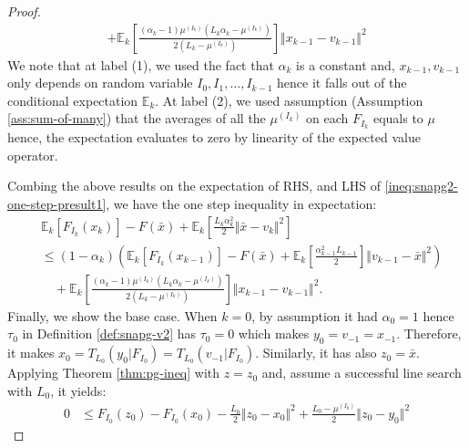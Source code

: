 \documentclass[12pt]{article}
\begin{document}
\begin{proof}
{\begin{align*}
                    + \mathbb E_k\left[
                        \frac{(\alpha_k - 1)\mu^{(I_k)}\left(L_k\alpha_k - \mu^{(I_k)}\right)}{2\left(L_k - \mu^{(I_k)}\right)}
                    \right]\Vert x_{k - 1} - v_{k - 1} \Vert^2
            \end{align*}
            }
            We note that at label (1), we used the fact that $\alpha_k$ is a constant and, $x_{k - 1}, v_{k - 1}$ only depends on random variable $I_0, I_1, \ldots, I_{k - 1}$ hence it falls out of the conditional expectation $\mathbb E_k$. 
            At label (2), we used assumption (Assumption \ref{ass:sum-of-many}) that the averages of all the $\mu^{(I_k)}$ on each $F_{I_k}$ equals to $\mu$ hence, the expectation evaluates to zero by linearity of the expected value operator. 
            \par
            Combing the above results on the expectation of RHS, and LHS of \eqref{ineq:snapg2-one-step-presult1}, we have the one step inequality in expectation: 
            \begin{align*}
                & \mathbb E_k\left[F_{I_k}(x_{k})\right] 
                - F(\bar x) 
                + \mathbb E_k\left[
                    \frac{L_k\alpha_k^2}{2}\Vert \bar x - v_k\Vert^2 
                \right]
                \\
                &\le 
                (1 - \alpha_k)\left(
                        \mathbb E_k \left[F_{I_k}(x_{k - 1})\right] 
                        - F(\bar x)
                        + \mathbb E_k \left[\frac{\alpha_{k - 1}^2L_{k - 1}}{2}\right]\Vert v_{k - 1} - \bar x\Vert^2
                \right)
                    \\ &\quad 
                    + \mathbb E_k\left[
                        \frac{(\alpha_k - 1)\mu^{(I_k)}\left(L_k\alpha_k - \mu^{(I_k)}\right)}{2\left(L_k - \mu^{(I_k)}\right)}
                    \right]\Vert x_{k - 1} - v_{k - 1} \Vert^2. 
            \end{align*}
            Finally, we show the base case. 
            When $k = 0$, by assumption it had $\alpha_0 = 1$ hence $\tau_0$ in Definition \ref{def:snapg-v2} has $\tau_0 = 0$ which makes $y_0 = v_{- 1} = x_{-1}$. 
            Therefore, it makes $x_0 = T_{L_0}(y_0 | F_{I_0}) = T_{L_0}(v_{-1} | F_{I_0})$. 
            Similarly, it has also $z_0 = \bar x$.
            Applying Theorem \ref{thm:pg-ineq} with $z = z_0$ and, assume a successful line search with $L_0$, it yields: 
            \begin{align*}
                0 &\le F_{I_0}(z_0) - F_{I_0}(x_0) - \frac{L_0}{2}\Vert z_0 - x_0\Vert^2 + \frac{L_0 - \mu^{(I_0)}}{2}\Vert z_0 - y_0\Vert^2

\end{align*}
\end{proof}
\end{document}
